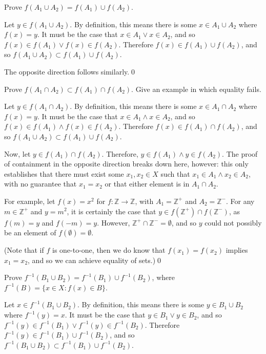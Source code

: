 \begin{exlist}
    \item Prove $f(A_1 \cup A_2) = f(A_1) \cup f(A_2)$.
    \hrlist

    Let $y \in f(A_1 \cup A_2)$. By definition, this means there is some $x \in A_1 \cup A_2$ where $f(x) = y$. It must be the case that $x \in A_1 \lor x \in A_2$, and so $f(x) \in f(A_1) \lor f(x) \in f(A_2)$. Therefore $f(x) \in f(A_1) \cup f(A_2)$, and so $f(A_1 \cup A_2) \subset f(A_1) \cup f(A_2)$.

    \medskip

    The opposite direction follows similarly.\qed
    \pagebreak
    \item\label{funcint} Prove $f(A_1 \cap A_2) \subset f(A_1) \cap f(A_2)$. Give an example in which equality fails.
    \hrlist

    Let $y \in f(A_1 \cap A_2)$. By definition, this means there is some $x \in A_1 \cap A_2$ where $f(x) = y$. It must be the case that $x \in A_1 \land x \in A_2$, and so $f(x) \in f(A_1) \land f(x) \in f(A_2)$. Therefore $f(x) \in f(A_1) \cap f(A_2)$, and so $f(A_1 \cup A_2) \subset f(A_1) \cup f(A_2)$.

    \medskip

    Now, let $y \in f(A_1) \cap f(A_2)$. Therefore, $y \in f(A_1) \land y \in f(A_2)$. The proof of containment in the opposite direction breaks down here, however: this only establishes that there must exist some $x_1, x_2 \in X$ such that $x_1 \in A_1 \land x_2 \in A_2$, with no guarantee that $x_1 = x_2$ or that either element is in $A_1 \cap A_2$.

    \medskip

    For example, let $f(x) = x^2$ for $f: \mathbb{Z} \rightarrow \mathbb{Z}$, with $A_1 = \mathbb{Z}^+$ and $A_2 = \mathbb{Z}^-$. For any $m \in \mathbb{Z}^+$ and $y = m^2$, it is certainly the case that $y \in f(\mathbb{Z}^+) \cap f(\mathbb{Z}^-)$, as $f(m) = y$ and $f(-m) = y$. However, $\mathbb{Z}^+ \cap \mathbb{Z}^- = \emptyset$, and so $y$ could not possibly be an element of $f(\emptyset) = \emptyset$.

    \medskip

    (Note that if $f$ is one-to-one, then we do know that $f(x_1) = f(x_2)$ implies $x_1 = x_2$, and so we can achieve equality of sets.)\qed
    \item Prove $f^{-1}(B_1 \cup B_2) = f^{-1}(B_1) \cup f^{-1}(B_2)$, where $f^{-1}(B) = \{x \in X : f(x) \in B\}$.
    \hrlist

    Let $x \in f^{-1}(B_1 \cup B_2)$. By definition, this means there is some $y \in B_1 \cup B_2$ where $f^{-1}(y) = x$. It must be the case that $y \in B_1 \lor y \in B_2$, and so $f^{-1}(y) \in f^{-1}(B_1) \lor f^{-1}(y) \in f^{-1}(B_2)$. Therefore $f^{-1}(y) \in f^{-1}(B_1) \cup f^{-1}(B_2)$, and so $f^{-1}(B_1 \cup B_2) \subset f^{-1}(B_1) \cup f^{-1}(B_2)$.


\end{exlist}

